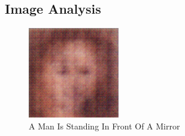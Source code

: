 \documentclass{article}%
\begin{document}
%
\subsection{Image Analysis}%
\label{subsec:ImageAnalysis}%


\begin{figure}[h!]%
\centering%
\includegraphics[width=150px]{500_fake_images/samples_5_171.png}%
\caption{A Man Is Standing In Front Of A Mirror}%
\end{figure}

%
\end{document}
